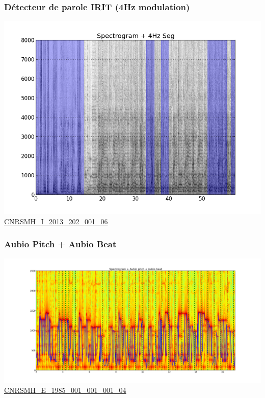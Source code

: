 \documentclass[10pt, final, hyperref, table]{beamer}
\begin{document}
\begin{frame}
\frametitle{Détecteur de parole IRIT (4Hz modulation)}
\begin{center}
\includegraphics[width=0.8\linewidth]{img/irit_speech4hz}\\
\href{sounds/CNRSMH_I_2013_202_001_06.mp3}{CNRSMH\_I\_2013\_202\_001\_06}
\end{center}
\end{frame}
\begin{frame}\frametitle{Aubio Pitch + Aubio Beat}
  \begin{center}
\includegraphics[width=1.1\linewidth]{img/aubio_pitch_beat.png}\\
\href{sounds/CNRSMH_E_1985_001_001_001_04.mp3}{CNRSMH\_E\_1985\_001\_001\_001\_04}
\end{center}
\end{frame}
\end{document}
